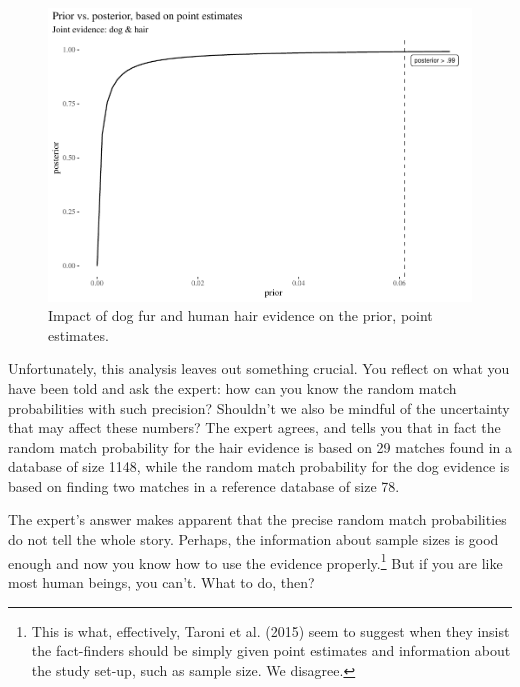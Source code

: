 \documentclass[
  10pt,
  dvipsnames,enabledeprecatedfontcommands]{scrartcl}
\begin{document}
\begin{figure}[H]

\begin{center}\includegraphics[width=0.6\linewidth]{imprecision_philosophical_paper2_files/figure-latex/impactOfPoint4-1} \end{center}
\caption{Impact of dog fur and human hair evidence on the prior, point estimates.}
\label{fig:impactOfPoint}
\end{figure}

Unfortunately, this analysis leaves out something crucial. You reflect
on what you have been told and ask the expert: how can you know the
random match probabilities with such precision? Shouldn't we also be
mindful of the uncertainty that may affect these numbers? The expert
agrees, and tells you that in fact the random match probability for the
hair evidence is based on 29 matches found in a database of size 1148,
while the random match probability for the dog evidence is based on
finding two matches in a reference database of size 78.

The expert's answer makes apparent that the precise random match
probabilities do not tell the whole story. Perhaps, the information
about sample sizes is good enough and now you know how
to
use the evidence properly.\footnote{This is what, effectively, Taroni et
  al. (2015) seem to suggest when they insist the fact-finders should be
  simply given point estimates and information about the study set-up,
  such as sample size. We disagree.} But if you are like most human
beings, you can't. What to do, then?
\end{document}
